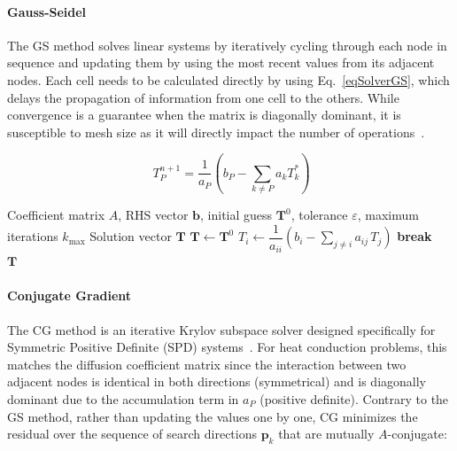 \paragraph{Gauss-Seidel}
The GS method solves linear systems by iteratively cycling through each node in sequence and updating them by using the most recent values from its adjacent nodes. Each cell needs to be calculated directly by using Eq.~\eqref{eqSolverGS}, which delays the propagation of information from one cell to the others. While convergence is a guarantee when the matrix is diagonally dominant, it is susceptible to mesh size as it will directly impact the number of operations~\cite{Versteeg2007}.

\begin{equation}~\label{eqSolverGS}
    T^{n+1}_P = \frac{1}{a_P} \left( b_P - \sum_{k \neq P} a_k T^*_{k} \right)
\end{equation}

\begin{algorithm}[ht]
\caption{Gauss-Seidel iterative solver}
\label{algGS}
\begin{algorithmic}[1]
    \Require Coefficient matrix $A$, RHS vector $\mathbf{b}$, initial guess $\mathbf{T}^0$, tolerance $\varepsilon$, maximum iterations $k_{\max}$
    \Ensure Solution vector $\mathbf{T}$
    \State $\mathbf{T} \gets \mathbf{T}^0$
            \State $T_i \gets \dfrac{1}{a_{ii}} \!\left( b_i - \displaystyle\sum_{j \neq i} a_{ij}\, T_j \right)$
        \EndFor
            \State \textbf{break}
        \EndIf
    \EndFor \\
    \Return $\mathbf{T}$
\end{algorithmic}
\end{algorithm}


\paragraph{Conjugate Gradient}
The CG method is an iterative Krylov subspace solver designed specifically for Symmetric Positive Definite (SPD) systems~\cite{Versteeg2007, Ferziger2002}. For heat conduction problems, this matches the diffusion coefficient matrix since the interaction between two adjacent nodes is identical in both directions (symmetrical) and is diagonally dominant due to the accumulation term in $a_P$ (positive definite). Contrary to the GS method, rather than updating the values one by one, CG minimizes the residual over the sequence of search directions $\mathbf{p}_k$ that are mutually $A$-conjugate:

